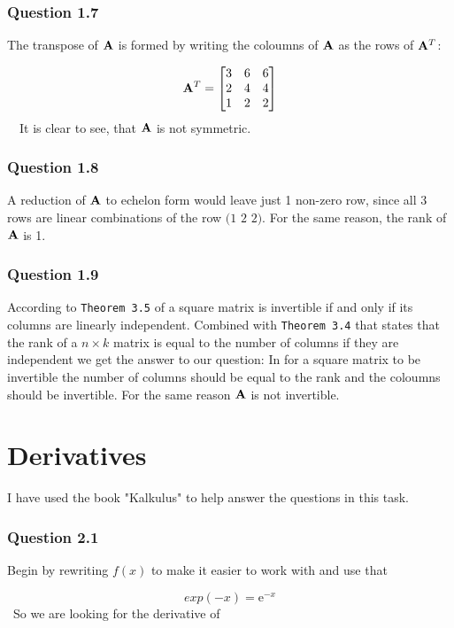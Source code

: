 \documentclass{article}
\begin{document}
\subsubsection*{Question 1.7}

The transpose of \({\mathbf A}\) is formed by writing the coloumns of \({\mathbf A}\) as the
rows of \({\mathbf A}^T\):

\[
{\mathbf A}^T =
\begin{bmatrix}
3 & 6 & 6 \\
2 & 4 & 4 \\
1 & 2 & 2
\end{bmatrix}
\]
\
\
It is clear to see, that \({\mathbf A}\) is not symmetric.

\subsubsection*{Question 1.8}

A reduction of \({\mathbf A}\) to echelon form would leave just 1 non-zero row, since
all 3 rows are linear combinations of the row \((1\) \(2\) \(2)\). For the same
reason, the rank of \({\mathbf A}\) is 1.

\subsubsection*{Question 1.9}

According to \texttt{Theorem 3.5} of \cite{algebra} a square matrix is
invertible if and only if its columns are linearly independent. Combined with
\texttt{Theorem 3.4} that states that the rank of a \(n \times k\) matrix is
equal to the number of columns if they are independent we get the answer to our
question: In for a square matrix to be invertible the number of columns should
be equal to the rank and the coloumns should be invertible. For the same reason
\({\mathbf A}\) is not invertible.


\section{Derivatives}
I have used the book "Kalkulus" \cite{kalkulus} to help answer the questions in this task.

\subsubsection*{Question 2.1}
Begin by rewriting \(f(x)\) to make it easier to work with and use that

\[
exp(-x) = \mathrm{e}^{-x}
\]
\
So we are looking for the derivative of
\end{document}
